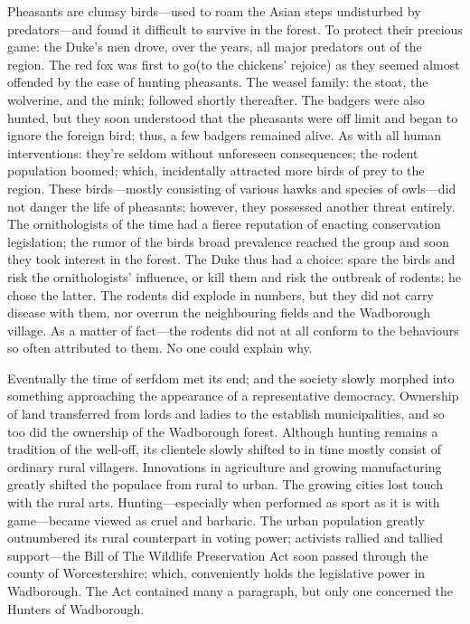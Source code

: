 Pheasants are clumsy birds---used to roam the Asian steps undisturbed by predators---and found it difficult to survive in the forest. To protect their precious game: the Duke's men drove, over the years, all major predators out of the region. The red fox was first to go(to the chickens' rejoice) as they seemed almost offended by the ease of hunting pheasants. The weasel family: the stoat, the wolverine, and the mink; followed shortly thereafter. The badgers were also hunted, but they soon understood that the pheasants were off limit and began to ignore the foreign bird; thus, a few badgers remained alive. As with all human interventions: they're seldom without unforeseen consequences; the rodent population boomed; which, incidentally attracted more birds of prey to the region. These birds---mostly consisting of various hawks and species of owls---did not danger the life of pheasants; however, they possessed another threat entirely. The ornithologists of the time had a fierce reputation of enacting conservation legislation; the rumor of the birds broad prevalence reached the group and soon they took interest in the forest. The Duke thus had a choice: spare the birds and risk the ornithologists' influence, or kill them and risk the outbreak of rodents; he chose the latter. The rodents did explode in numbers, but they did not carry disease with them, nor overrun the neighbouring fields and the Wadborough village. As a matter of fact---the rodents did not at all conform to the behaviours so often attributed to them. No one could explain why.

Eventually the time of serfdom met its end; and the society slowly morphed into something approaching the appearance of a representative democracy. Ownership of land transferred from lords and ladies to the establish municipalities, and so too did the ownership of the Wadborough forest. Although hunting remains a tradition of the well-off, its clientele slowly shifted to in time mostly consist of ordinary rural villagers.   
Innovations in agriculture and growing manufacturing greatly shifted the populace from rural to urban. The growing cities lost touch with the rural arts. Hunting---especially when performed as sport as it is with game---became viewed as cruel and barbaric. The urban population greatly outnumbered its rural counterpart in voting power; activists rallied and tallied support---the Bill of The Wildlife Preservation Act soon passed through the county of Worcestershire; which, conveniently holds the legislative power in Wadborough. The Act contained many a paragraph, but only one concerned the Hunters of Wadborough. 

